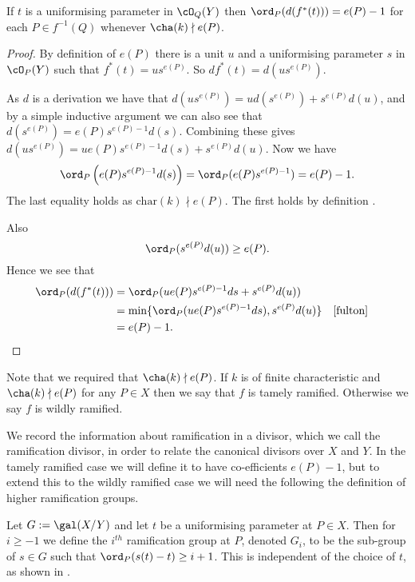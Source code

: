 \begin{lem}
	If $t$ is a uniformising parameter in $\cO_{Q}(Y)$ then $\ord_{P}(d(f^*(t)))=e(P)-1$ for each $P\in f^{-1}(Q)$ whenever $\cha(k)\nmid e(P)$.
\end{lem}
\begin{proof}
	By definition of $e(P)$ there is a unit $u$ and a uniformising parameter $s$ in $\cO_{P}(Y)$ such that $f^*(t)=us^{e(P)}$.
	So $df^*(t)=d(us^{e(P)})$.

	As $d$ is a derivation we have that $d(us^{e(P)})=ud(s^{e(P)})+s^{e(P)}d(u)$, and by a simple inductive argument we can also see that $d(s^{e(P)})=e(P)s^{e(P)-1}d(s)$.
	Combining these gives $d(us^{e(P)})=ue(P)s^{e(P)-1}d(s)+s^{e(P)}d(u)$.
	Now we have
		\begin{equation*}
			\ord_{P}\left(e(P)s^{e(P)-1}d(s)\right)= \ord_{P}(e(P)s^{e(P)-1})=e(P)-1.
		\end{equation*}
	The last equality holds as $\mbox{char}(k)\nmid e(P)$.
	The first holds by definition \cite[pg.107]{fulton}.

	Also
		\begin{equation*}
			\ord_{P}(s^{e(P)}d(u))\geq e(P).
		\end{equation*}
	Hence we see that
		\begin{align*}
			\ord_{P}(d(f^*(t))) & = \ord_{P}(ue(P)s^{e(P)-1}ds+s^{e(P)}d(u)) \\
			& =  \mbox{min}\{ \ord_{P}(ue(P)s^{e(P)-1}ds),s^{e(P)}d(u) \} && \mbox{\cite[pg. 48]{fulton}}\\
			& = e(P)-1. \\
		\end{align*}
\end{proof}

Note that we required that $\cha(k)\nmid e(P)$.
If $k$ is of finite characteristic and $\cha(k)\nmid e(P)$ for any $P\in X$ then we say that $f$ is tamely ramified.
Otherwise we say $f$ is wildly ramified.

We record the information about ramification in a divisor, which we call the ramification divisor, in order to relate the canonical divisors over $X$ and $Y$.
In the tamely ramified case we will define it to have co-efficients $e(P)-1$, but to extend this to the wildly ramified case we will need the following the definition of higher ramification groups.\\

\begin{defn}
	Let $G:=\gal(X/Y)$ and let $t$ be a uniformising parameter at $P\in X$.
	Then for $i\geq -1$ we define the $i^{th}$ ramification group at $P$, denoted $G_i$, to be the sub-group of $s\in G$ such that $\ord_P(s(t)-t)\geq i+1$.
	This is	independent of the choice of $t$, as shown in { \em \cite[$\S$1, Ch. IV]{localfields}}.
\end{defn}

